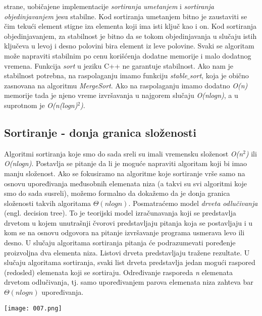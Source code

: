 \documentclass{article}
\begin{document}
strane, uobičajene implementacije \textit{sortiranja umetanjem}
i \textit{sortiranja objedinjavanjem} jesu stabilne. Kod sortiranja
umetanjem bitno je zaustaviti se čim tekući element stigne iza elementa koji
ima isti ključ kao i on. Kod sortiranja objedinjavanjem, za stabilnost je bitno da se tokom
objedinjavanja u slučaju istih ključeva u levoj i desno polovini bira element iz
leve polovine.
Svaki se algoritam može napraviti stabilnim po cenu korišćenja dodatne memorije
i malo dodatnog vremena. 
Funkcija \textit{sort} u jeziku C++ ne garantuje stabilnost. Ako nam
je stabilnost potrebna, na raspolaganju imamo funkciju \textit{stable$\_$sort}, koja je
obično zasnovana na algoritmu \textit{MergeSort}. Ako na raspolaganju imamo dodatno
\textit{O(n)} memorije tada je njeno vreme izvršavanja u najgorem slučaju \textit{O(nlogn)}, a u suprotnom je \textit{O(n(logn)$^2$)}.

\subsection{Sortiranje - donja granica složenosti}
Algoritmi sortiranja koje smo do sada sreli su imali vremensku složenost \textit{O(n$^2$)} ili
\textit{O(nlogn)}. Postavlja se pitanje da li je moguće napraviti algoritam koji bi imao
manju složenost. Ako
se fokusiramo na algoritme koje sortiranje vrše samo na osnovu upoređivanja
međusobnih elemenata niza (a takvi su svi algoritmi koje smo do sada susreli),
možemo formalno da dokažemo da je donja granica složenosti takvih algoritama $\Theta(nlogn)$.
\newline
Posmatraćemo model \textit{drveta odlučivanja} (engl. decision tree). To je
teorijski model izračunavanja koji se predstavlja drvetom u kojem unutrašnji
čvorovi predstavljaju pitanja koja se postavljaju i u kom se na osnovu odgovora
na pitanje izvršavanje programa usmerava levo ili desno. U slučaju algoritama
sortiranja pitanja će podrazumevati poređenje proizvoljna dva elementa niza.
Listovi drveta predstavljaju tražene rezultate. U slučaju algoritama sortiranja,
svaki list drveta predstavlja jedan mogući raspored (redosled) elemenata koji se 
sortiraju. Određivanje rasporeda \textit{n} elemenata
drvetom odlučivanja, tj. samo upoređivanjem parova elemenata niza zahteva
bar $\Theta(nlogn)$ upoređivanja.
\begin{center}
   \texttt{[image: 007.png]}
\end{center}
\end{document}
